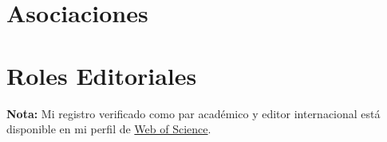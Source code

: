 \documentclass[11pt,a4paper,]{awesome-cv}
\begin{document}
\endgroup

\hypertarget{asociaciones}{%
\section{Asociaciones}\label{asociaciones}}

\begin{cventries}
    \vspace{-4.0mm}
    \vspace{-4.0mm}
    \vspace{-4.0mm}
\end{cventries}

\hypertarget{roles-editoriales}{%
\section{Roles Editoriales}\label{roles-editoriales}}

\begin{footnotesize}
\textbf{Nota:} Mi registro verificado como par académico y editor internacional está disponible en mi perfil de \href{https://www.webofscience.com/wos/author/record/387716}{Web of Science}.
\end{footnotesize}
\end{document}
